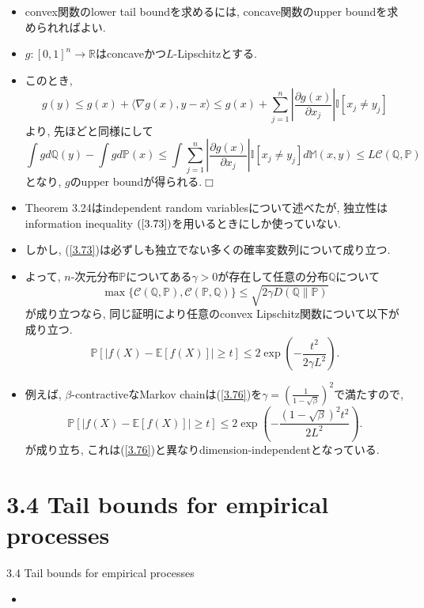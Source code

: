 \documentclass[aspectratio=169, dvipdfmx]{beamer}
\def\qed{\hfill $\Box$}
\newcommand{\ex}{\mathbb{E}}
\newcommand{\bb}{\mathbb}
\newcommand{\cc}{\mathcal}
\begin{document}
\begin{frame}
\begin{itemize}
    \item convex関数のlower tail boundを求めるには, concave関数のupper boundを求められればよい.
    \item $g:[0,1]^n \to \bb{R}$はconcaveかつ$L$-Lipschitzとする.
    \item このとき,
    \[
        g(y)
        \le g(x) + \langle\nabla g(x), y-x \rangle
        \le g(x) + \sum_{j=1}^n \left|\frac{\partial g(x)}{\partial x_j}\right|\bb{I}[x_j \ne y_j]
    \]
    より, 先ほどと同様にして
    \[
        \int g d\bb{Q}(y) - \int g d\bb{P}(x)
        \le \int \sum_{j=1}^n \left|\frac{\partial g(x)}{\partial x_j}\right|\bb{I}[x_j \ne y_j]d\bb{M}(x, y)
        \le L \cc{C}(\bb{Q}, \bb{P})
    \]
     となり, $g$のupper boundが得られる.\qed
\end{itemize}
\end{frame}

\begin{frame}
\begin{itemize}
    \item Theorem 3.24はindependent random variablesについて述べたが,
          独立性はinformation inequality $(\ref{3.73})$を用いるときにしか使っていない.
    \item しかし, (\ref{3.73})は必ずしも独立でない多くの確率変数列について成り立つ.
    \item よって, $n$-次元分布$\bb{P}$についてある$\gamma > 0$が存在して任意の分布$\bb{Q}$について
    \[
        \max\{\cc{C}(\bb{Q}, \bb{P}), \cc{C}(\bb{P}, \bb{Q})\}
        \le \sqrt{2 \gamma D(\bb{Q} \| \bb{P})}
        \tag{3.76}\label{3.76}
    \]
    が成り立つなら, 同じ証明により任意のconvex Lipschitz関数について以下が成り立つ.
    \[
        \bb{P}[|f(X) - \ex[f(X)]| \ge t] \le 2 \exp\left( - \frac{t^2}{2\gamma L^2}\right).
        \label{3.77}\tag{3.77} 
    \]
    \item 例えば, $\beta$-contractiveなMarkov chainは(\ref{3.76})を$\gamma =\left(\frac{1}{1-\sqrt{\beta}}\right)^2$で満たすので,
    \[
        \bb{P}[|f(X) - \ex[f(X)]| \ge t] \le 2 \exp\left( - \frac{ (1 - \sqrt{\beta})^2 t^2}{2 L^2}\right).
        \label{3.78}\tag{3.78} 
    \]
    が成り立ち, これは(\ref{3.76})と異なりdimension-independentとなっている.
\end{itemize}
\end{frame}

\section{3.4 Tail bounds for empirical processes}
\begin{frame}{3.4 Tail bounds for empirical processes}
\begin{itemize}
    \item 
\end{itemize}
\end{frame}
\end{document}
